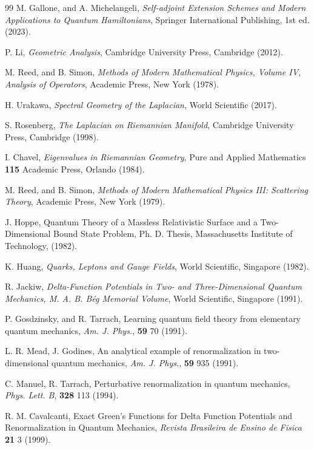 \documentclass[amsmath,amssymb,14pt]{article}
\numberwithin{equation}{section}
\begin{document}
\begin{thebibliography}{99}
 M. Gallone, and A. Michelangeli, \textit{Self-adjoint Extension Schemes and Modern Applications to Quantum Hamiltonians}, Springer International Publishing, 1st ed. (2023).

 P. Li, \textit{Geometric Analysis}, Cambridge University Press, Cambridge (2012).

 M. Reed, and B. Simon, \textit{Methods of Modern Mathematical Physics, Volume IV, Analysis of Operators}, Academic Press, New York (1978).


 H.  Urakawa, \textit{Spectral Geometry of the Laplacian}, World Scientific (2017).


 S. Rosenberg, \textit{The Laplacian on Riemannian
Manifold}, Cambridge University Press, Cambridge (1998).

 I. Chavel, \textit{Eigenvalues in Riemannian
Geometry}, Pure and Applied Mathematics \textbf{115} Academic Press,
Orlando (1984).


 M. Reed, and B. Simon, \textit{Methods of Modern Mathematical Physics III: Scattering Theory}, Academic Press, New York (1979).

 J. Hoppe, Quantum Theory of a Massless Relativistic Surface and a Two-
Dimensional Bound State Problem, Ph. D. Thesis, Massachusetts Institute of Technology, (1982).

 K. Huang, \textit{Quarks, Leptons and Gauge Fields}, World
Scientific, Singapore (1982).


 R. Jackiw, \textit{Delta-Function Potentials in Two- and Three-Dimensional
Quantum Mechanics, M. A. B. B\'{e}g Memorial Volume}, World
Scientific, Singapore (1991).


 P. Gosdzinsky, and R. Tarrach, Learning quantum field
theory from elementary quantum mechanics, \textit{Am. J. Phys.},
\textbf{59} 70 (1991).


 L. R. Mead, J. Godines, An analytical example of
renormalization in two-dimensional quantum mechanics,
\textit{Am. J. Phys.}, \textbf{59} 935 (1991).


 C. Manuel, R. Tarrach, Perturbative renormalization in
quantum mechanics, \textit{Phys. Lett. B}, \textbf{328} 113 (1994).


 R. M. Cavalcanti, Exact Green's Functions for Delta Function Potentials
and Renormalization in Quantum Mechanics, \textit{Revista Brasileira de Ensino de Fisica} \textbf{21} 3 (1999).


\end{thebibliography}
\end{document}
